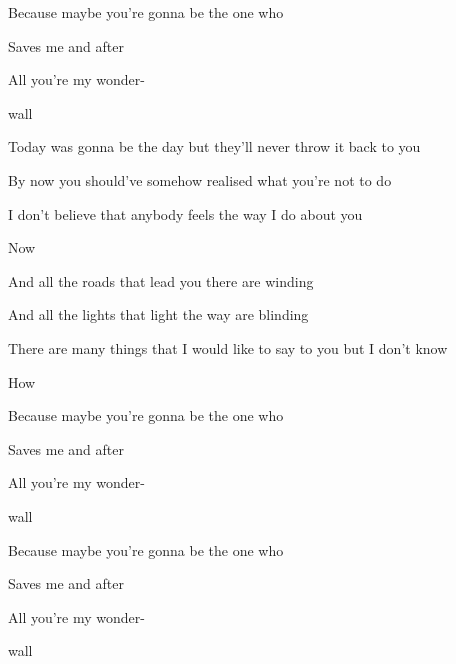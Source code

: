 \begin{song}
\bigskip

Because maybe   you're gonna be the one who \par
{}Saves me   and after \par
{}All   you're my wonder- \par
{}wall     \par

\bigskip

 Today was gonna be the day but they'll never throw it back to you \par
{} By now you should've somehow realised what you’re not to do \par
{}I don't believe that anybody feels the way I do about you \par
{}Now    \par

\bigskip

And all the roads that lead you there are winding \par
And all the lights that light the way are blinding \par
{}There are many things that I would like to say to you but I don't know \par
{}How \par

\bigskip

Because maybe   you're gonna be the one who \par
{}Saves me   and after \par
{}All   you're my wonder- \par
{}wall    \par

\bigskip

Because maybe   you're gonna be the one who \par
{}Saves me   and after \par
{}All   you're my wonder- \par
{}wall    \par

\vfill

\end{song}